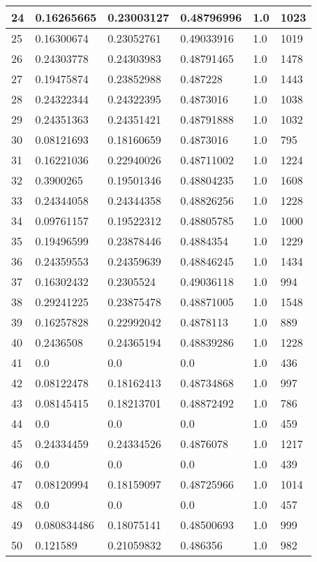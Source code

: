 \begin{longtable}{|l|l|l|l|l|l|}
24 & 0.16265665 & 0.23003127 & 0.48796996 & 1.0 & 1023 \\ \hline 
25 & 0.16300674 & 0.23052761 & 0.49033916 & 1.0 & 1019 \\ \hline 
26 & 0.24303778 & 0.24303983 & 0.48791465 & 1.0 & 1478 \\ \hline 
27 & 0.19475874 & 0.23852988 & 0.487228 & 1.0 & 1443 \\ \hline 
28 & 0.24322344 & 0.24322395 & 0.4873016 & 1.0 & 1038 \\ \hline 
29 & 0.24351363 & 0.24351421 & 0.48791888 & 1.0 & 1032 \\ \hline 
30 & 0.08121693 & 0.18160659 & 0.4873016 & 1.0 & 795 \\ \hline 
31 & 0.16221036 & 0.22940026 & 0.48711002 & 1.0 & 1224 \\ \hline 
32 & 0.3900265 & 0.19501346 & 0.48804235 & 1.0 & 1608 \\ \hline 
33 & 0.24344058 & 0.24344358 & 0.48826256 & 1.0 & 1228 \\ \hline 
34 & 0.09761157 & 0.19522312 & 0.48805785 & 1.0 & 1000 \\ \hline 
35 & 0.19496599 & 0.23878446 & 0.4884354 & 1.0 & 1229 \\ \hline 
36 & 0.24359553 & 0.24359639 & 0.48846245 & 1.0 & 1434 \\ \hline 
37 & 0.16302432 & 0.2305524 & 0.49036118 & 1.0 & 994 \\ \hline 
38 & 0.29241225 & 0.23875478 & 0.48871005 & 1.0 & 1548 \\ \hline 
39 & 0.16257828 & 0.22992042 & 0.4878113 & 1.0 & 889 \\ \hline 
40 & 0.2436508 & 0.24365194 & 0.48839286 & 1.0 & 1228 \\ \hline 
41 & 0.0 & 0.0 & 0.0 & 1.0 & 436 \\ \hline 
42 & 0.08122478 & 0.18162413 & 0.48734868 & 1.0 & 997 \\ \hline 
43 & 0.08145415 & 0.18213701 & 0.48872492 & 1.0 & 786 \\ \hline 
44 & 0.0 & 0.0 & 0.0 & 1.0 & 459 \\ \hline 
45 & 0.24334459 & 0.24334526 & 0.4876078 & 1.0 & 1217 \\ \hline 
46 & 0.0 & 0.0 & 0.0 & 1.0 & 439 \\ \hline 
47 & 0.08120994 & 0.18159097 & 0.48725966 & 1.0 & 1014 \\ \hline 
48 & 0.0 & 0.0 & 0.0 & 1.0 & 457 \\ \hline 
49 & 0.080834486 & 0.18075141 & 0.48500693 & 1.0 & 999 \\ \hline 
50 & 0.121589 & 0.21059832 & 0.486356 & 1.0 & 982 \\ \hline 
\end{longtable}